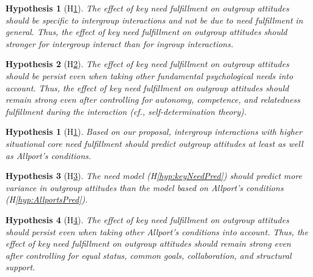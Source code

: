 \documentclass[nobib]{tufte-handout}
\theoremstyle{break}
\theoremstyle{plain}
\newtheorem{hyp}{Hypothesis}
\newtheorem{subhyp}{Hypothesis}
\begin{document}
\begin{subhyp}[H\ref{hyp:keyNeedContactType}] \label{hyp:keyNeedContactType}
\addtolength{\leftskip}{2.5em}
The  effect of key need fulfillment on outgroup attitudes should be specific to intergroup interactions and not be due to need fulfillment in general. Thus, the effect of key need fulfillment on outgroup attitudes should stronger for intergroup interact than for ingroup interactions. 
\end{subhyp}

\begin{subhyp}[H\ref{hyp:keyNeedSDT}] \label{hyp:keyNeedSDT}
\addtolength{\leftskip}{2.5em}
The  effect of key need fulfillment on outgroup attitudes should be persist even when taking other fundamental psychological needs into account. Thus, the effect of key need fulfillment on outgroup attitudes should remain strong even after controlling for autonomy, competence, and relatedness fulfillment during the interaction (cf., self-determination theory). 
\end{subhyp}

\begin{hyp}[H\ref{hyp:comparison}] \label{hyp:comparison}
Based on our proposal, intergroup interactions with higher situational core need fulfillment should predict outgroup attitudes at least as well as Allport's conditions.
\end{hyp}

\setcounter{subhyp}{0}
\begin{subhyp}[H\ref{hyp:compModel}] \label{hyp:compModel}
\addtolength{\leftskip}{2.5em}
The need model  (H\ref{hyp:keyNeedPred}) should predict more variance in outgroup attitudes than the model based on Allport's conditions (H\ref{hyp:AllportsPred}).
\end{subhyp}

\begin{subhyp}[H\ref{hyp:compTogether}] \label{hyp:compTogether}
\addtolength{\leftskip}{2.5em}
The  effect  of key need fulfillment on outgroup attitudes should  persist even when taking other Allport's conditions into account. Thus, the effect of key need fulfillment on outgroup attitudes should remain strong even after controlling for equal status, common goals, collaboration, and structural support.
\end{subhyp}
\end{document}
